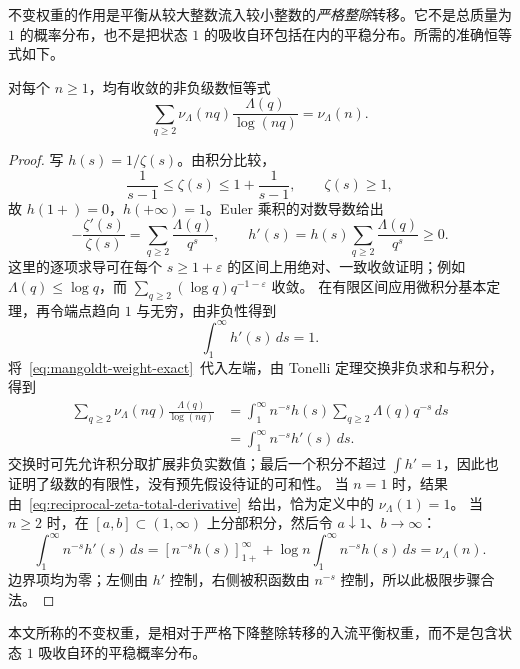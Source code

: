 不变权重的作用是平衡从较大整数流入较小整数的\emph{严格整除}转移。它不是总质量为 $1$ 的概率分布，也不是把状态 $1$ 的吸收自环包括在内的平稳分布。所需的准确恒等式如下。
\begin{proposition}[严格入流恒等式]\label{prop:mangoldt-inflow}
对每个 $n\ge1$，均有收敛的非负级数恒等式
\begin{equation}\label{eq:mangoldt-inflow}
 \boxed{\sum_{q\ge2}\nu_\Lambda(nq)\frac{\Lambda(q)}{\log(nq)}
 =\nu_\Lambda(n).}
\end{equation}
\end{proposition}
\begin{proof}
写 $h(s)=1/\zeta(s)$。由积分比较，
\[
 \frac1{s-1}\le\zeta(s)\le1+\frac1{s-1},\qquad \zeta(s)\ge1,
\]
故 $h(1+)=0$，$h(+\infty)=1$。Euler 乘积的对数导数给出
\begin{equation}\label{eq:reciprocal-zeta-derivative}
 -\frac{\zeta'(s)}{\zeta(s)}=\sum_{q\ge2}\frac{\Lambda(q)}{q^s},
 \qquad h'(s)=h(s)\sum_{q\ge2}\frac{\Lambda(q)}{q^s}\ge0.
\end{equation}
这里的逐项求导可在每个 $s\ge1+\varepsilon$ 的区间上用绝对、一致收敛证明；例如 $\Lambda(q)\le\log q$，而 $\sum_{q\ge2}(\log q)q^{-1-\varepsilon}$ 收敛。
在有限区间应用微积分基本定理，再令端点趋向 $1$ 与无穷，由非负性得到
\begin{equation}\label{eq:reciprocal-zeta-total-derivative}
 \int_1^\infty h'(s)\,ds=1.
\end{equation}
将~\eqref{eq:mangoldt-weight-exact}~代入左端，由 Tonelli 定理交换非负求和与积分，得到
\begin{align*}
 \sum_{q\ge2}\nu_\Lambda(nq)\frac{\Lambda(q)}{\log(nq)}
 &=\int_1^\infty n^{-s}h(s)\sum_{q\ge2}\Lambda(q)q^{-s}\,ds\\
 &=\int_1^\infty n^{-s}h'(s)\,ds.
\end{align*}
交换时可先允许积分取扩展非负实数值；最后一个积分不超过 $\int h'=1$，因此也证明了级数的有限性，没有预先假设待证的可和性。
当 $n=1$ 时，结果由~\eqref{eq:reciprocal-zeta-total-derivative}~给出，恰为定义中的 $\nu_\Lambda(1)=1$。
当 $n\ge2$ 时，在 $[a,b]\subset(1,\infty)$ 上分部积分，然后令 $a\downarrow1$、$b\to\infty$：
\[
 \int_1^\infty n^{-s}h'(s)\,ds
 =[n^{-s}h(s)]_{1+}^{\infty}
   +\log n\int_1^\infty n^{-s}h(s)\,ds
 =\nu_\Lambda(n).
\]
边界项均为零；左侧由 $h'$ 控制，右侧被积函数由 $n^{-s}$ 控制，所以此极限步骤合法。
\end{proof}

本文所称的不变权重，是相对于严格下降整除转移的入流平衡权重，而不是包含状态 $1$ 吸收自环的平稳概率分布。

